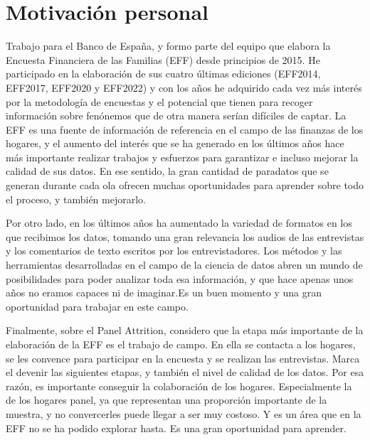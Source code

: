\section{Motivación personal}

Trabajo para el Banco de España, y formo parte del equipo que elabora la Encuesta Financiera de las Familias (EFF) desde principios de 2015. He participado en la elaboración de sus cuatro últimas ediciones (EFF2014, EFF2017, EFF2020 y EFF2022) y con los años he adquirido cada vez más interés por la metodología de encuestas y el potencial que tienen para recoger información sobre fenónemos que de otra manera serían difíciles de captar. La EFF es una fuente de información de referencia en el campo de las finanzas de los hogares, y el aumento del interés que se ha generado en los últimos años hace más importante realizar trabajos y esfuerzos para garantizar e incluso mejorar la calidad de sus datos. En ese sentido, la gran cantidad de paradatos que se generan durante cada ola ofrecen muchas oportunidades para aprender sobre todo el proceso, y también mejorarlo.

Por otro lado, en los últimos años ha aumentado la variedad de formatos en los que recibimos los datos, tomando una gran relevancia los audios de las entrevistas y los comentarios de texto escritos por los entrevistadores. Los métodos y las herramientas desarrolladas en el campo de la ciencia de datos abren un mundo de posibilidades para poder analizar toda esa información, y que hace apenas unos años no eramos capaces ni de imaginar.Es un buen momento y una gran oportunidad para trabajar en este campo.

Finalmente, sobre el Panel Attrition, considero que la etapa más importante de la elaboración de la EFF es el trabajo de campo. En ella se contacta a los hogares, se les convence para participar en la encuesta y se realizan las entrevistas. Marca el devenir las siguientes etapas, y también el nivel de calidad de los datos. Por esa razón, es importante conseguir la colaboración de los hogares. Especialmente la de los hogares panel, ya que representan una proporción importante de la muestra, y no convercerles puede llegar a ser muy costoso. Y es un área que en la EFF no se ha podido explorar hasta. Es una gran oportunidad para aprender.